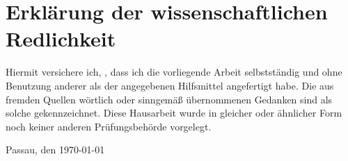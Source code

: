 \newpage
\section*{Erklärung der wissenschaftlichen Redlichkeit}

Hiermit versichere ich, \theauthor, dass ich die
vorliegende Arbeit selbstständig und ohne Benutzung anderer
als der angegebenen Hilfsmittel angefertigt habe. Die aus
fremden Quellen wörtlich oder sinngemäß übernommenen Gedanken
sind als solche gekennzeichnet. Diese Hausarbeit wurde
in gleicher oder ähnlicher Form noch keiner anderen
Prüfungsbehörde vorgelegt.

\vspace*{1cm}

Passau, den \today\\[0.5cm]
\hspace{0.5cm} \makebox[4cm]{\hrulefill}\\
\theauthor